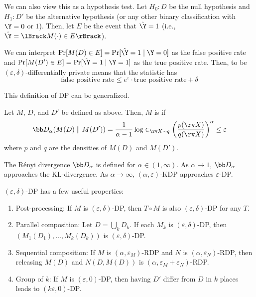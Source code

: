 \documentclass[class=cs480,notes,tikz]{agony}
\begin{document}
We can also view this as a hypothesis test.
Let $H_0 : D$ be the null hypothesis and $H_1 : D'$ be the alternative hypothesis
(or any other binary classification with $\Y = 0$ or $1$).
Then, let $E$ be the event that $\hat{\Y} = 1$ (i.e., $\hat{\Y} = \lBrack M(\cdot) \in E \rBrack$).

We can interpret $\Pr[M(D) \in E] = \Probability[\hat\Y = 1 \mid \Y = 0]$ as the false positive rate
and $\Pr[M(D') \in E] = \Probability[\hat\Y = 1 \mid \Y = 1]$ as the true positive rate.
Then, to be $(\varepsilon,\delta)$-differentially private means that the statistic has
\[
  \text{false positive rate} \leq e^{\varepsilon}\cdot\text{true positive rate} + \delta
\]

This definition of DP can be generalized.

\begin{defn}
  Let $M$, $D$, and $D'$ be defined as above.
  Then, $M$ is  if
  \[ \bb D_\alpha(M(D) \parallel M(D')) = \frac{1}{\alpha-1}\log \E_{\rv X \sim q}\qty(\frac{p(\rv X)}{q(\rv X)})^\alpha \leq \varepsilon \]
  where $p$ and $q$ are the densities of $M(D)$ and $M(D')$.
\end{defn}

The Rényi divergence $\bb D_\alpha$ is defined for $\alpha \in (1,\infty)$.
As $\alpha \to 1$, $\bb D_\alpha$ approaches the KL-divergence.
As $\alpha \to \infty$, $(\alpha,\varepsilon)$-KDP approaches $\varepsilon$-DP.

\begin{prop}
  $(\varepsilon,\delta)$-DP has a few useful properties:
  \begin{enumerate}
    \item Post-processing: If $M$ is $(\varepsilon,\delta)$-DP,
          then $T \circ M$ is also $(\varepsilon,\delta)$-DP for any $T$.
    \item Parallel composition: Let $D = \bigcup_k D_k$.
          If each $M_k$ is $(\varepsilon,\delta)$-DP,
          then $(M_1(D_1),\dotsc,M_k(D_k))$ is $(\varepsilon,\delta)$-DP.
    \item Sequential composition: If $M$ is $(\alpha,\varepsilon_M)$-RDP
          and $N$ is $(\alpha,\varepsilon_N)$-RDP,
          then releasing $M(D)$ and $N(D,M(D))$
          is $(\alpha,\varepsilon_M+\varepsilon_N)$-RDP.
    \item Group of $k$: If $M$ is $(\varepsilon,0)$-DP,
          then having $D'$ differ from $D$ in $k$ places leads to $(k\varepsilon,0)$-DP.
  \end{enumerate}
\end{prop}
\end{document}
